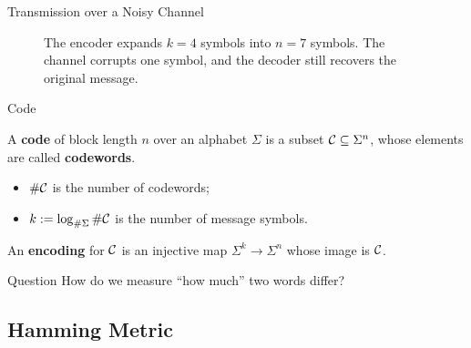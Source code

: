 \documentclass{zkdl-presentation-template}
\begin{document}
\begin{frame}{Transmission over a Noisy Channel}
\begin{figure}
{%
            }
            \caption{The encoder expands $k = 4$ symbols into $n = 7$ symbols. The channel corrupts one symbol, and the decoder still recovers the original message.}
        \end{figure}
    \end{frame}

    \begin{frame}{Code}
        \begin{definition}[Code]
            A \textbf{code} of block length $n$ over an alphabet $\Sigma$ is a subset $\mathcal{C} \subseteq \Sigma^n$, whose elements are called \textbf{codewords}.
            \begin{itemize}
                \item $\#\mathcal{C}$ is the number of codewords;
                \item $k := \log_{\#\Sigma} \#\mathcal{C}$ is the number of message symbols.
            \end{itemize}
            An \textbf{encoding} for $\mathcal{C}$ is an injective map $\Sigma^k \to \Sigma^n$ whose image is $\mathcal{C}$.
        \end{definition}
        \pause

        \begin{questionblock}{Question}
            How do we measure ``how much'' two words differ?
        \end{questionblock}
    \end{frame}

    \subsection{Hamming Metric}
\end{document}
